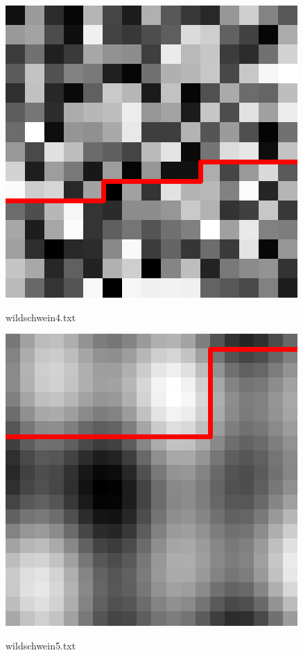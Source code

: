 \documentclass[a4paper, 12pt]{scrartcl}
\begin{document}
\begin{center}
	\begin{minipage}[t]{.3\textwidth}
		\centering
		\includegraphics[width=\textwidth]{img/resized4}\par
		\ttfamily wildschwein4.txt
	\end{minipage}\hspace*{6mm}
	\begin{minipage}[t]{.3\textwidth}
		\centering
		\includegraphics[width=\textwidth]{img/resized5}\par
		\ttfamily wildschwein5.txt
	\end{minipage}
\end{center}
\end{document}
